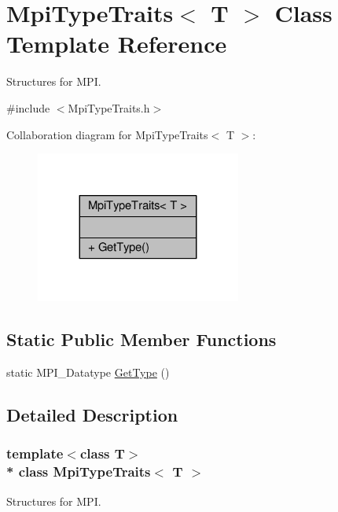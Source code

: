 \hypertarget{structMpiTypeTraits}{}\section{Mpi\+Type\+Traits$<$ T $>$ Class Template Reference}
\label{structMpiTypeTraits}


Structures for M\+PI.  




{\ttfamily \#include $<$Mpi\+Type\+Traits.\+h$>$}



Collaboration diagram for Mpi\+Type\+Traits$<$ T $>$\+:
\nopagebreak
\begin{figure}[H]
\begin{center}
\leavevmode
\includegraphics[width=191pt]{structMpiTypeTraits__coll__graph}
\end{center}
\end{figure}
\subsection*{Static Public Member Functions}
\begin{DoxyCompactItemize}
\item 
static M\+P\+I\+\_\+\+Datatype \hyperlink{structMpiTypeTraits_ae839c28621a048734d2ad38f6272a4f1}{Get\+Type} ()
\end{DoxyCompactItemize}


\subsection{Detailed Description}
\subsubsection*{template$<$class T$>$\\*
class Mpi\+Type\+Traits$<$ T $>$}

Structures for M\+PI. 

